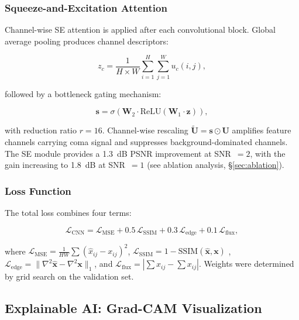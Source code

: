 \documentclass[usenatbib]{mnras}
\begin{document}
\subsubsection{Squeeze-and-Excitation Attention}

Channel-wise SE attention \citep{hu18} is applied after each convolutional block. Global average pooling produces channel descriptors:

\begin{equation}\label{eq:se_squeeze}
z_c = \frac{1}{H \times W} \sum_{i=1}^{H} \sum_{j=1}^{W} u_c(i, j),
\end{equation}

followed by a bottleneck gating mechanism:

\begin{equation}\label{eq:se_excitation}
\mathbf{s} = \sigma\left(\mathbf{W}_2 \cdot \text{ReLU}\left(\mathbf{W}_1 \cdot \mathbf{z}\right)\right),
\end{equation}

with reduction ratio $r=16$. Channel-wise rescaling $\tilde{\mathbf{U}} = \mathbf{s} \odot \mathbf{U}$ amplifies feature channels carrying coma signal and suppresses background-dominated channels. The SE module provides a 1.3~dB PSNR improvement at SNR~$=2$, with the gain increasing to 1.8~dB at SNR~$=1$ (see ablation analysis, \S\ref{sec:ablation}).

\subsubsection{Loss Function}

The total loss combines four terms:

\begin{equation}\label{eq:total_loss}
\mathcal{L}_{\text{CNN}} = \mathcal{L}_{\text{MSE}} + 0.5\,\mathcal{L}_{\text{SSIM}} + 0.3\,\mathcal{L}_{\text{edge}} + 0.1\,\mathcal{L}_{\text{flux}},
\end{equation}

where $\mathcal{L}_{\text{MSE}} = \frac{1}{HW}\sum(\hat{x}_{ij} - x_{ij})^2$, $\mathcal{L}_{\text{SSIM}} = 1 - \text{SSIM}(\hat{\mathbf{x}}, \mathbf{x})$ \citep{wang04}, $\mathcal{L}_{\text{edge}} = \|\nabla^2\hat{\mathbf{x}} - \nabla^2\mathbf{x}\|_1$, and $\mathcal{L}_{\text{flux}} = |\sum\hat{x}_{ij} - \sum x_{ij}|$. Weights were determined by grid search on the validation set.

\subsection{Explainable AI: Grad-CAM Visualization}\label{sec:xai}
\end{document}
